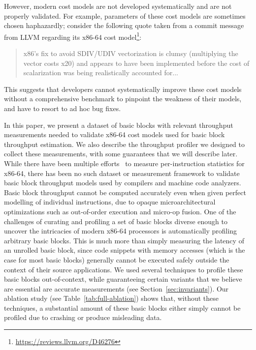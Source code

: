However, modern cost models are not developed systematically and are not properly validated.
For example, parameters of these cost models 
are sometimes chosen haphazardly;
consider the following quote taken from a commit message from LLVM\cite{llvm}
regarding its x86-64 cost model\footnote{
\url{https://reviews.llvm.org/D46276}
}:
\begin{quote}
x86's fix to avoid SDIV/UDIV vectorization is clumsy
(multiplying the vector costs x20)
and appears to have been implemented before the cost of
scalarization was being realistically accounted for...
\end{quote}
This suggests that
developers cannot systematically improve these cost models
without a comprehensive benchmark to pinpoint the weakness of their models,
and have to resort to ad hoc bug fixes.

In this paper, we present a dataset
of basic blocks with relevant throughput measurements needed to validate x86-64 cost models used for
basic block throughput estimation. 
We also describe the throughput profiler we designed to collect these measurements,
with some guarantees that we will describe later.
While there have been multiple efforts~\cite{agner,uops,exegesis} to measure per-instruction
statistics for x86-64,
there has been no such dataset or measurement framework to validate basic block throughput models used by
compilers and machine code analyzers.
Basic block throughput cannot be computed accurately even when given perfect modelling of individual instructions,
due to opaque microarchitectural optimizations such as out-of-order execution and micro-op fusion.
One of the challenges of curating and profiling a set of basic blocks diverse enough to
uncover the intricacies of modern x86-64 processors is automatically profiling arbitrary
basic blocks.
This is much more than simply measuring the latency of an unrolled basic block,
since code snippets with memory accesses (which is the case for most basic blocks)
generally cannot be executed safely
outside the context of their source applications.
We used several techniques to profile these basic blocks out-of-context,
while guaranteeing certain variants that we believe are essential are accurate measurements (see Section~\ref{sec:invariants}).
Our ablation study (see Table~\ref{tab:full-ablation}) shows that, without these techniques,
a substantial amount of these basic blocks either simply cannot be profiled due to crashing
or produce misleading data.

